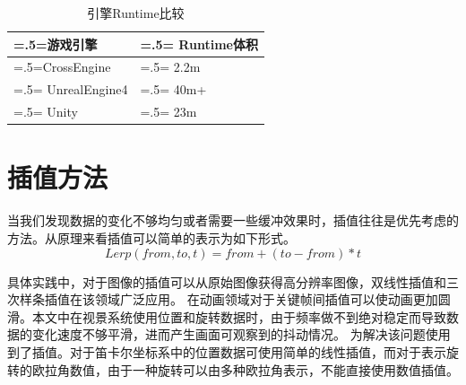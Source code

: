 \begin{table}[h!]
    \begin{center}
        \caption{引擎Runtime比较}
        \label{enginert}
        \renewcommand\arraystretch{1.5}
        \begin{tabularx}{0.8\textwidth}{ 
            | >{\centering\arraybackslash\hsize=.5\hsize\linewidth=\hsize}X 
            | >{\centering\arraybackslash\hsize=.5\hsize\linewidth=\hsize}X 
            | }
            \hline
            \textbf{游戏引擎} & \textbf{Runtime体积} \\
            \hline
            CrossEngine & 2.2m \\
            \hline
            UnrealEngine4 & 40m+\\
            \hline
            Unity & 23m\\
            \hline
        \end{tabularx}
    \end{center}
\end{table}



\section{插值方法}
当我们发现数据的变化不够均匀或者需要一些缓冲效果时，插值往往是优先考虑的方法。从原理来看插值可以简单的表示为如下形式。
$$Lerp(from,to,t)=from+(to-from)*t$$
\par
具体实践中，对于图像的插值可以从原始图像获得高分辨率图像，双线性插值和三次样条插值在该领域广泛应用\cite{lerp2}。
在动画领域对于关键帧间插值可以使动画更加圆滑。本文中在视景系统使用位置和旋转数据时，由于频率做不到绝对稳定而导致数据的变化速度不够平滑，进而产生画面可观察到的抖动情况。
为解决该问题使用到了插值。对于笛卡尔坐标系中的位置数据可使用简单的线性插值，而对于表示旋转的欧拉角数值，由于一种旋转可以由多种欧拉角表示，不能直接使用数值插值。
